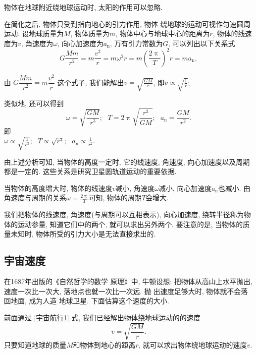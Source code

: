 \documentclass[11pt,a4paper]{ctexbook}
\newcommand{\bre}{\ \ \ }
\begin{document}
物体在地球附近绕地球运动时, 太阳的作用可以忽略.

在简化之后, 物体只受到指向地心的引力作用, 物体
绕地球的运动可视作匀速圆周运动. 设地球质量为$M$, 物体质量为$m$,
物体中心与地球中心的距离为$r$, 物体的线速度为$v$, 角速度为$\omega$, 向心加速度为$a_\mathrm{n}$,
万有引力常数为$G$, 可以列出以下关系式
\begin{equation}
	G\frac{Mm}{r^2} = m\frac{v^2}{r}= m\omega^2 r = m\left(\frac{2\uppi}{T}\right)^2r= ma_\mathrm{n},
	\label{宇宙航行1}
\end{equation}

由 $G\dfrac{Mm}{r^2} = m\dfrac{v^2}{r}$ 这个式子, 我们能解出$v = \sqrt{\displaystyle\frac{GM}{r}}$, 即$v\propto \sqrt{\displaystyle\frac1r}$;\par\vspace{8pt}

类似地, 还可以得到$$\omega = \sqrt{\displaystyle\frac{GM}{r^3}}; \bre T = 2\uppi\sqrt{\dfrac{r^3}{GM}};\bre a_\mathrm{n} = \displaystyle\frac{GM}{r^2}.$$
即\bre\bre\bre\bre\bre\bre\bre\bre\bre\bre\bre\bre\bre\bre\bre\bre\bre$\omega \propto \sqrt{\displaystyle\frac{1}{r^3}};\bre T \propto \sqrt{r^3};\bre a_\mathrm{n}\propto \displaystyle\frac{1}{r^2}.$\vspace{10pt}

由上述分析可知, 当物体的高度一定时, 它的线速度, 角速度, 向心加速度以及周期都是一定的. 这些关系是研究卫星圆轨道运动的重要依据.

当物体的高度增大时, 物体的线速度$v$减小, 角速度$\omega$减小, 向心加速度$a_\mathrm{n}$也减小.
由角速度与周期的关系$\omega = \displaystyle\frac{2\uppi}{T}$可知, 物体的周期$T$会增大.

我们把物体的线速度, 角速度(与周期可以互相表示), 向心加速度, 绕转半径称为物体的运动参量, 知道它们中的两个, 就可以求出另外两个.
要注意的是, 当物体的质量未知时, 物体所受的引力大小是无法直接求出的.

\subsection{宇宙速度}

{\kaishu 在1687年出版的《自然哲学的数学
原理》中, 牛顿设想: 把物体从高山上水平抛出,
速度一次比一次大, 落地点也就一次比一次远. 抛
出速度足够大时, 物体就不会落回地面, 成为人造
地球卫星. 下面估算这个速度的大小.}

前面通过 \eqref{宇宙航行1} 式, 我们已经解出物体绕地球运动的的速度
$$v = \sqrt{\displaystyle\frac{GM}{r}}. $$
只要知道地球的质量$M$和物体到地心的距离$r$, 就可以求出物体绕地球运动的速度$v$.
\end{document}
